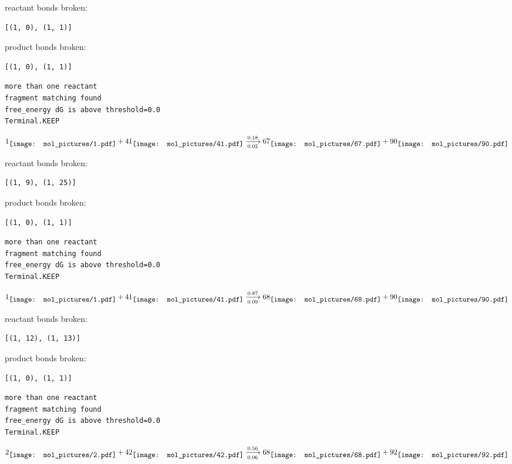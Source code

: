 \documentclass{article}
\begin{document}
reactant bonds broken:\begin{verbatim}
[(1, 0), (1, 1)]
\end{verbatim}
product bonds broken:\begin{verbatim}
[(1, 0), (1, 1)]
\end{verbatim}




\vspace{1cm}
\begin{verbatim}
more than one reactant
fragment matching found
free_energy dG is above threshold=0.0
Terminal.KEEP
\end{verbatim}
$$
1
\raisebox{-.5\height}{\texttt{[image: mol\_pictures/1.pdf]}}
+
41
\raisebox{-.5\height}{\texttt{[image: mol\_pictures/41.pdf]}}
\xrightarrow[0.02]{0.18}
67
\raisebox{-.5\height}{\texttt{[image: mol\_pictures/67.pdf]}}
+
90
\raisebox{-.5\height}{\texttt{[image: mol\_pictures/90.pdf]}}
$$


reactant bonds broken:\begin{verbatim}
[(1, 9), (1, 25)]
\end{verbatim}
product bonds broken:\begin{verbatim}
[(1, 0), (1, 1)]
\end{verbatim}




\vspace{1cm}
\begin{verbatim}
more than one reactant
fragment matching found
free_energy dG is above threshold=0.0
Terminal.KEEP
\end{verbatim}
$$
1
\raisebox{-.5\height}{\texttt{[image: mol\_pictures/1.pdf]}}
+
41
\raisebox{-.5\height}{\texttt{[image: mol\_pictures/41.pdf]}}
\xrightarrow[0.09]{0.87}
68
\raisebox{-.5\height}{\texttt{[image: mol\_pictures/68.pdf]}}
+
90
\raisebox{-.5\height}{\texttt{[image: mol\_pictures/90.pdf]}}
$$


reactant bonds broken:\begin{verbatim}
[(1, 12), (1, 13)]
\end{verbatim}
product bonds broken:\begin{verbatim}
[(1, 0), (1, 1)]
\end{verbatim}




\vspace{1cm}
\begin{verbatim}
more than one reactant
fragment matching found
free_energy dG is above threshold=0.0
Terminal.KEEP
\end{verbatim}
$$
2
\raisebox{-.5\height}{\texttt{[image: mol\_pictures/2.pdf]}}
+
42
\raisebox{-.5\height}{\texttt{[image: mol\_pictures/42.pdf]}}
\xrightarrow[0.06]{0.56}
68
\raisebox{-.5\height}{\texttt{[image: mol\_pictures/68.pdf]}}
+
92
\raisebox{-.5\height}{\texttt{[image: mol\_pictures/92.pdf]}}
$$
\end{document}
